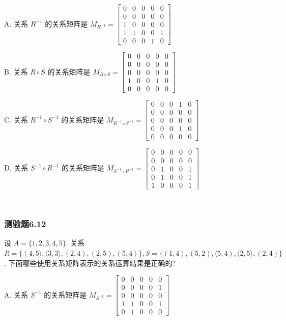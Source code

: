 \documentclass[UTF8, heading=true]{ctexart}
\begin{document}
A. 关系 $R^{-1}$ 的关系矩阵是 $M_{R^{-1}}=\left[\begin{array}{lllll}0 & 0 & 0 & 0 & 0 \\ 0 & 0 & 0 & 0 & 0 \\ 1 & 0 & 0 & 0 & 0 \\ 1 & 1 & 0 & 0 & 1 \\ 0 & 0 & 0 & 1 & 0\end{array}\right]$

B. 关系 $R \circ S$ 的关系矩阵是 $M_{R \circ S}=\left[\begin{array}{ccccc}0 & 0 & 0 & 0 & 0 \\ 0 & 0 & 0 & 0 & 0 \\ 0 & 0 & 0 & 0 & 0 \\ 1 & 0 & 0 & 1 & 0 \\ 0 & 0 & 0 & 0 & 0\end{array}\right]$

C. 关系 $R^{-1} \circ S^{-1}$ 的关系矩阵是 $M_{R^{-1} \circ S^{-1}}=\left[\begin{array}{ccccc}0 & 0 & 0 & 1 & 0 \\ 0 & 0 & 0 & 0 & 0 \\ 0 & 0 & 0 & 0 & 0 \\ 0 & 0 & 0 & 1 & 0 \\ 0 & 0 & 0 & 0 & 0\end{array}\right]$

D. 关系 $S^{-1} \circ R^{-1}$ 的关系矩阵是 $M_{S^{-1} \circ R^{-1}}=\left[\begin{array}{ccccc}0 & 0 & 0 & 0 & 0 \\ 0 & 0 & 0 & 0 & 0 \\ 0 & 1 & 0 & 0 & 1 \\ 0 & 1 & 0 & 0 & 1 \\ 1 & 0 & 0 & 0 & 1\end{array}\right]$

\textcolor{white}{答案：CD}

\subsubsection{测验题6.12}

设 $A=\{1,2,3,4,5\}$. 关系 $R=\{(4,5\rangle,\langle 3,3\rangle,(2,4),(2,5),(5,4)\}, S=\{(1,4),(5,2),\langle 5,4),(2,5\rangle,(2,4)\}$.
下面哪些使用关系矩阵表示的关系运算结果是正确的?

A. 关系 $S^{-1}$ 的关系矩阵是 $M_{S^{-1}}=\left[\begin{array}{ccccc}0 & 0 & 0 & 0 & 0 \\ 0 & 0 & 0 & 0 & 1 \\ 0 & 0 & 0 & 0 & 0 \\ 1 & 1 & 0 & 0 & 1 \\ 0 & 1 & 0 & 0 & 0\end{array}\right]$
\end{document}
